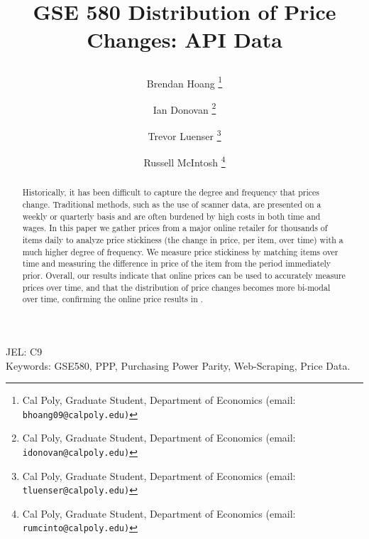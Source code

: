 \documentclass[12pt]{article}
\newcommand{\trevor}[1]{\textcolor{deepblue}{#1}}
\begin{document}
\title{GSE 580 Distribution of Price Changes: API Data

\author{Brendan Hoang 
\thanks{Cal Poly, Graduate Student, Department of Economics (email:
\tt{bhoang09@calpoly.edu})}
\and Ian Donovan
\thanks{Cal Poly, Graduate Student, Department of Economics (email:
\tt{idonovan@calpoly.edu})}
\and Trevor Luenser
\thanks{Cal Poly, Graduate Student, Department of Economics (email:
\tt{tluenser@calpoly.edu})}
\and Russell McIntosh
\thanks{Cal Poly, Graduate Student, Department of Economics (email:
\tt{rumcinto@calpoly.edu})}
}}


\maketitle


\begin{abstract}

\trevor{Historically, it has been difficult to capture the degree and frequency that prices change.  Traditional methods, such as the use of scanner data, are presented on a weekly or quarterly basis and are often burdened by high costs in both time and wages.  In this paper we gather prices from a major online retailer for thousands of items daily to analyze price stickiness (the change in price, per item, over time) with a much higher degree of frequency.  We measure price stickiness by matching items over time and measuring the difference in price of the item from the period immediately prior.  Overall, our results indicate that online prices can be used to accurately measure prices over time, and that the distribution of price changes becomes more bi-modal over time, confirming the online price results in \citep{Cavallo2015}.
}

\end{abstract}


\noindent JEL: C9 \\
\noindent Keywords: GSE580, PPP, Purchasing Power Parity, Web-Scraping, Price Data.
\thispagestyle{empty}







\newpage


\afterpage{\clearpage}



\end{document}
